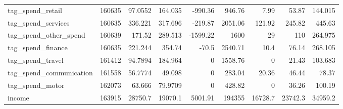 \begin{tabular}{lrrrrrrrr}
 tag\_spend\_retail        &  160635 &    97.0552     &   164.035    &   -990.36    &    946.76    &     7.99      &    53.87       &   144.015    \\
 tag\_spend\_services      &  160635 &   336.221      &   317.696    &   -219.87    &   2051.06    &   121.92      &   245.82       &   445.63     \\
 tag\_spend\_other\_spend   &  160639 &   171.52       &   289.513    &  -1599.22    &   1600       &    29         &   110          &   264.975    \\
 tag\_spend\_finance       &  160635 &   221.244      &   354.74     &    -70.5     &   2540.71    &    10.4       &    76.14       &   268.105    \\
 tag\_spend\_travel        &  161412 &    94.7894     &   184.964    &      0       &   1558.76    &     0         &    21.43       &   103.683    \\
 tag\_spend\_communication &  161558 &    56.7774     &    49.098    &      0       &    283.04    &    20.36      &    46.44       &    78.37     \\
 tag\_spend\_motor         &  162073 &    63.666      &    79.9709   &      0       &    428.82    &     0         &    36.26       &   100.19     \\
 income                  &  163915 & 28750.7        & 19070.1      &   5001.91    & 194355       & 16728.7       & 23742.3        & 34959.2      \\
\bottomrule
\end{tabular}
